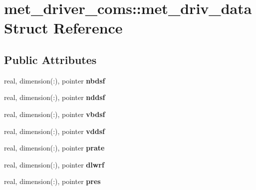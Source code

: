 \hypertarget{structmet__driver__coms_1_1met__driv__data}{
\section{met\_\-driver\_\-coms::met\_\-driv\_\-data Struct Reference}
\label{structmet__driver__coms_1_1met__driv__data}
}
\subsection*{Public Attributes}
\begin{DoxyCompactItemize}
\item 
\hypertarget{structmet__driver__coms_1_1met__driv__data_a59645787527da7dfeeb468a489ff597d}{
real, dimension(:), pointer {\bfseries nbdsf}}
\label{structmet__driver__coms_1_1met__driv__data_a59645787527da7dfeeb468a489ff597d}

\item 
\hypertarget{structmet__driver__coms_1_1met__driv__data_aee5f411734e74c01b751422850732745}{
real, dimension(:), pointer {\bfseries nddsf}}
\label{structmet__driver__coms_1_1met__driv__data_aee5f411734e74c01b751422850732745}

\item 
\hypertarget{structmet__driver__coms_1_1met__driv__data_a83d2297b0226d48fe7434f1cfa967a0c}{
real, dimension(:), pointer {\bfseries vbdsf}}
\label{structmet__driver__coms_1_1met__driv__data_a83d2297b0226d48fe7434f1cfa967a0c}

\item 
\hypertarget{structmet__driver__coms_1_1met__driv__data_a33dda6bfee15af3a81cba12dd8083ce4}{
real, dimension(:), pointer {\bfseries vddsf}}
\label{structmet__driver__coms_1_1met__driv__data_a33dda6bfee15af3a81cba12dd8083ce4}

\item 
\hypertarget{structmet__driver__coms_1_1met__driv__data_a6202ec01ddf13a39086cc5478c4a46d1}{
real, dimension(:), pointer {\bfseries prate}}
\label{structmet__driver__coms_1_1met__driv__data_a6202ec01ddf13a39086cc5478c4a46d1}

\item 
\hypertarget{structmet__driver__coms_1_1met__driv__data_a7f728356671f57fccf22cf800ea24cb4}{
real, dimension(:), pointer {\bfseries dlwrf}}
\label{structmet__driver__coms_1_1met__driv__data_a7f728356671f57fccf22cf800ea24cb4}

\item 
\hypertarget{structmet__driver__coms_1_1met__driv__data_a36357e0a30b35fdee5304bcd10399410}{
real, dimension(:), pointer {\bfseries pres}}
\label{structmet__driver__coms_1_1met__driv__data_a36357e0a30b35fdee5304bcd10399410}


\end{DoxyCompactItemize}

